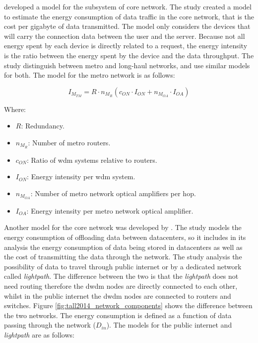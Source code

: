 \citet{Schien2015} developed a model for the subsystem of core network. The study created a model to estimate the energy consumption of data traffic in the core network, that is the cost per \ac{gigabyte} of data transmitted. 
The model only considers the devices that will carry the connection data between the user and the server. Because not all energy spent by each device is directly related to a request, the energy intensity is the ratio between the energy spent by the device and the data throughput. The study distinguish between metro and long-haul networks, and use similar models for both. The model for the metro network is as follows:

\begin{equation}
\label{formula:schien_core_metro}
    I_{M_{TM}} = R \cdot n_{M_R} (c_{ON} \cdot I_{ON} + n_{M_{OA}} \cdot I_{OA})
\end{equation}

Where:

\begin{itemize}
    \item $R$: Redundancy.
    \item $n_{M_R}$: Number of metro routers.
    \item $c_{ON}$: Ratio of \ac{wdm} systems relative to routers.
    \item $I_{ON}$: Energy intensity per \ac{wdm} system.
    \item $n_{M_{OA}}$: Number of metro network optical amplifiers per hop.
    \item $I_{OA}$: Energy intensity per metro network optical amplifier.
\end{itemize}


Another model for the core network was developed by \citet{Tall2014}. The study models the energy consumption of offloading data between datacenters, so it includes in  its analysis the energy consumption of data being stored in datacenters as well as the cost of transmitting the data through the network. 
The study analysis the possibility of data to travel through public internet or by a dedicated network called \textit{lightpath}. The difference between the two is that the \textit{lightpath} does not need routing therefore the \ac{dwdm} nodes are directly connected to each other, whilst in the public internet the \ac{dwdm} nodes are connected to routers and switches. Figure \ref{fig:tall2014_network_components} shows the difference between the two networks. The energy consumption is defined as a function of data passing through the network ($D_{in}$). The models for the public internet and \textit{lightpath} are as follows:

